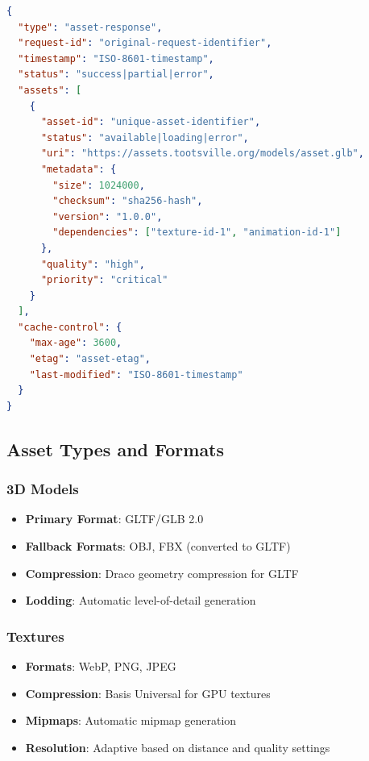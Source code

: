 \documentclass[12pt,a4paper]{article}
\begin{document}
\begin{lstlisting}[language=JSON, caption=Asset Response Message Format]
{
  "type": "asset-response",
  "request-id": "original-request-identifier",
  "timestamp": "ISO-8601-timestamp",
  "status": "success|partial|error",
  "assets": [
    {
      "asset-id": "unique-asset-identifier",
      "status": "available|loading|error",
      "uri": "https://assets.tootsville.org/models/asset.glb",
      "metadata": {
        "size": 1024000,
        "checksum": "sha256-hash",
        "version": "1.0.0",
        "dependencies": ["texture-id-1", "animation-id-1"]
      },
      "quality": "high",
      "priority": "critical"
    }
  ],
  "cache-control": {
    "max-age": 3600,
    "etag": "asset-etag",
    "last-modified": "ISO-8601-timestamp"
  }
}
\end{lstlisting}

\subsection{Asset Types and Formats}

\subsubsection{3D Models}

\begin{itemize}
\item \textbf{Primary Format}: GLTF/GLB 2.0
\item \textbf{Fallback Formats}: OBJ, FBX (converted to GLTF)
\item \textbf{Compression}: Draco geometry compression for GLTF
\item \textbf{Lodding}: Automatic level-of-detail generation
\end{itemize}

\subsubsection{Textures}

\begin{itemize}
\item \textbf{Formats}: WebP, PNG, JPEG
\item \textbf{Compression}: Basis Universal for GPU textures
\item \textbf{Mipmaps}: Automatic mipmap generation
\item \textbf{Resolution}: Adaptive based on distance and quality settings
\end{itemize}
\end{document}
